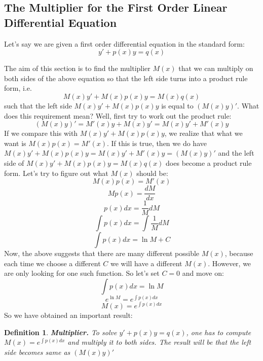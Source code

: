 \documentclass[12pt]{report}
\newtheorem{df}{Definition}[section]
\begin{document}
\subsection*{ The Multiplier for the First Order Linear Differential Equation}

Let's say we are given a first order differential equation in the standard form:
$$y'+p(x) y = q(x)$$

The aim of this section is to find the multiplier $M(x)$ that we can multiply on both sides of the above equation so that the left side turns into a product rule form, i.e.
$$M(x) y'+ M(x)p(x) y = M(x)q(x)$$
such that the left side $M(x) y'+ M(x)p(x) y$ is equal to $\left( M(x) y \right)' $. What does this requirement mean? Well, first try to work out the product rule:
$$\left( M(x) y \right)' = M'(x) y + M(x) y' = M(x) y' + M'(x) y$$
If we compare this with $M(x) y'+ M(x)p(x) y$, we realize that what we want is $M(x) p(x) = M'(x)$. If this is true, then we do have $M(x) y'+ M(x)p(x) y =  M(x) y' + M'(x) y = \left( M(x) y \right)'$ and the left side of $M(x) y'+ M(x)p(x) y = M(x)q(x)$ does become a product rule form.
Let's try to figure out what $M(x)$ should be:
$$M(x) p(x) = M'(x)$$
$$M p(x) = \frac{dM}{dx}$$
$$ p(x) dx = \frac{1}{M} dM $$
$$ \int p(x) dx = \int \frac{1}{M} dM $$
$$ \int p(x) dx = \ln M + C $$
Now, the above suggests that there are many different possible $M(x)$, because each time we choose a different $C$ we will have a different $M(x)$. However, we are only looking for one such function. So let's set $C=0$ and move on:
$$ \int p(x) dx = \ln M $$
$$ e^{\ln M} = e^{\int p(x) dx} $$
$$M(x) = e^{\int p(x) dx} $$
So we have obtained an important result:
\begin{df} \textbf{Multiplier.}
To solve $y'+p(x) y = q(x)$, one has to compute $M(x) = e^{\int p(x) dx} $ and multiply it to both sides. The result will be that the left side becomes same as $\left( M(x) y \right)'$
\end{df}
\end{document}
